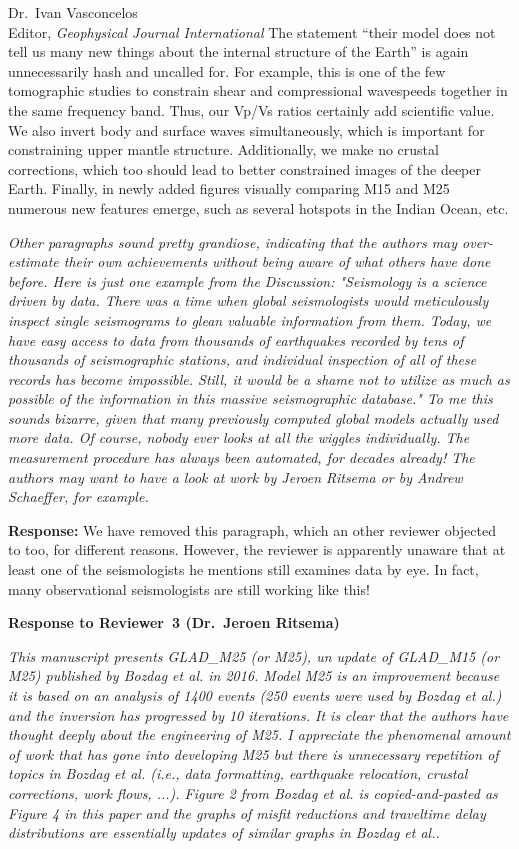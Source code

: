 \documentclass[11pt,a4paper]{letter}
\newcommand{\response}[1]{\textbf{Response:} #1}
\newcommand{\rev}[1]{{\it{#1}}}
\begin{document}
\begin{letter}{Dr.~Ivan Vasconcelos\\
Editor, \textit{Geophysical Journal International}}
{The statement ``their model does not tell us many new things about the internal structure of the Earth'' is again unnecessarily hash and uncalled for.
For example,
this is one of the few tomographic studies to constrain shear and compressional wavespeeds together in the same frequency band.
Thus, our Vp/Vs ratios certainly add scientific value.
We also invert body and surface waves simultaneously, which is important for constraining upper mantle structure.
Additionally, we make no crustal corrections, 
which too should lead to better constrained images of the deeper Earth.
Finally, in newly added figures visually comparing M15 and M25 numerous new features emerge,
such as several hotspots in the Indian Ocean, etc. 
}

\rev{Other paragraphs sound pretty grandiose, indicating that the authors may over-estimate their own achievements without being aware of what others have done before. Here is just one example from the Discussion: "Seismology is a science driven by data. There was a time when global seismologists would meticulously inspect single seismograms to glean valuable information from them. Today, we have easy access to data from thousands of earthquakes recorded by tens of thousands of seismographic stations, and individual inspection of all of these records has become impossible. Still, it would be a shame not to utilize as much as possible of the information in this massive seismographic database." To me this sounds bizarre, given that many previously computed global models actually used more data. Of course, nobody ever looks at all the wiggles individually. The measurement procedure has always been automated, for decades already! The authors may want to have a look at work by Jeroen Ritsema or by Andrew Schaeffer, for example.
}

\response{We have removed this paragraph, which an other reviewer objected to too, for different reasons.
However, the reviewer is apparently unaware that at least one of the seismologists he mentions still examines data by eye.
In fact,
many observational seismologists are still working like this!
}

{\textbf{\large{Response to Reviewer~3 (Dr.~Jeroen Ritsema)}}}

\rev{This manuscript presents GLAD\_M25 (or M25), un update of GLAD\_M15 (or M25) published by Bozdag et al. in 2016. Model M25 is an improvement because it is based on an analysis of 1400 events (250 events were used by Bozdag et al.) and the inversion has progressed by 10 iterations.
It is clear that the authors have thought deeply about the engineering of M25. I appreciate the phenomenal amount of work that has gone into developing M25 but there is unnecessary repetition of topics in Bozdag et al. (i.e., data formatting, earthquake relocation, crustal corrections, work flows, ...).
Figure 2 from Bozdag et al. is copied-and-pasted as Figure 4 in this paper and the graphs of misfit reductions and traveltime delay distributions are essentially updates of similar graphs in Bozdag et al..
}


\end{letter}
\end{document}
